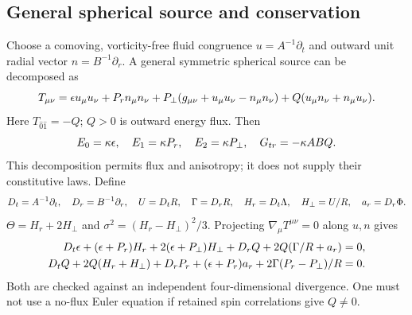 \subsection{General spherical source and conservation}
Choose a comoving, vorticity-free fluid congruence $u=A^{-1}\partial_t$ and outward unit radial vector $n=B^{-1}\partial_r$. A general symmetric spherical source can be decomposed as
\begin{equation}\label{eq:stress}
 T_{\mu\nu}=\epsilon u_\mu u_\nu+P_r n_\mu n_\nu+P_\perp(g_{\mu\nu}+u_\mu u_\nu-n_\mu n_\nu)
 +Q(u_\mu n_\nu+n_\mu u_\nu).
\end{equation}
Here $T_{\hat0\hat1}=-Q$; $Q>0$ is outward energy flux. Then
\begin{equation}\label{eq:EFE}
 E_0=\kappa\epsilon,\quad E_1=\kappa P_r,\quad E_2=\kappa P_\perp,\quad G_{tr}=-\kappa ABQ.
\end{equation}
This decomposition permits flux and anisotropy; it does not supply their constitutive laws. Define
\begin{equation}
 D_t=A^{-1}\partial_t,\quad D_r=B^{-1}\partial_r,\quad U=D_t R,\quad\Gamma=D_r R,
 \quad H_r=D_t\Lambda,\quad H_\perp=U/R,\quad a_r=D_r\Phi.
\end{equation}
$\Theta=H_r+2H_\perp$ and $\sigma^2=(H_r-H_\perp)^2/3$. Projecting $\nabla_\mu T^{\mu\nu}=0$ along $u,n$ gives
\begin{align}
 D_t\epsilon+(\epsilon+P_r)H_r+2(\epsilon+P_\perp)H_\perp+D_r Q+2Q(\Gamma/R+a_r)&=0,\label{eq:energy}\\
 D_t Q+2Q(H_r+H_\perp)+D_r P_r+(\epsilon+P_r)a_r+2\Gamma(P_r-P_\perp)/R&=0.\label{eq:momentum}
\end{align}
Both are checked against an independent four-dimensional divergence. One must not use a no-flux Euler equation if retained spin correlations give $Q\neq0$.

